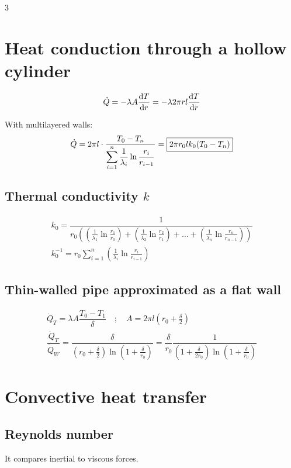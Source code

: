 \documentclass[9pt, landscape, a4paper]{article}
\begin{document}
\begin{multicols*}{3}
\section{Heat conduction through a hollow cylinder}
\begin{gather*}
  \dot{Q} = -\lambda A \dfrac{{\mathrm{d}}{T}}{\mathrm{d}{r}} = -\lambda 2\pi r l \dfrac{{\mathrm{d}}{T}}{\mathrm{d}{r}}\\
\end{gather*}
\vspace*{-.9cm}

With multilayered walls:
\begin{gather*}
  \dot{Q} = 2\pi l \cdot \dfrac{T_0 - T_n}{\displaystyle \sum_{i=1}^n \dfrac{1}{\lambda_i} \ln\dfrac{r_i}{r_{i-1}}} = \boxed{2\pi r_0 l k_0 (T_0 - T_n)}
\end{gather*}

\subsection{Thermal conductivity $k$}
\begin{gather*}
  k_0 = \dfrac{1}{r_0\left(\left(\frac{1}{\lambda_1} \ln\frac{r_1}{r_0}\right) + \left(\frac{1}{\lambda_2} \ln\frac{r_2}{r_1}\right) + \dots + \left(\frac{1}{\lambda_n} \ln\frac{r_n}{r_{n-1}}\right)\right)}\\[.3cm]
  k_0^{-1} = r_0\sum_{i=1}^{n}\left(\frac{1}{\lambda_i}\ln\frac{r_i}{r_{i-1}}\right)
\end{gather*}

\subsection{Thin-walled pipe approximated as a flat wall}
\begin{gather*}
  \dot{Q}_T = \lambda A \dfrac{T_0 - T_1}{\delta}\quad ; \quad A = 2\pi l \left(r_0 + \frac{\delta}{2}\right)\\
  \dfrac{\dot{Q}_T}{\dot{Q}_W} = \dfrac{\delta}{\left(r_0 + \frac{\delta}{2}\right)\ln\left(1+\frac{\delta}{r_0}\right)} = \dfrac{\delta}{r_0} \dfrac{1}{\left(1+\frac{\delta}{2r_0}\right) \ln\left(1+\frac{\delta}{r_0}\right)}
\end{gather*}

\section{Convective heat transfer}
\subsection{Reynolds number}
It compares inertial to viscous forces.


\end{multicols*}
\end{document}
